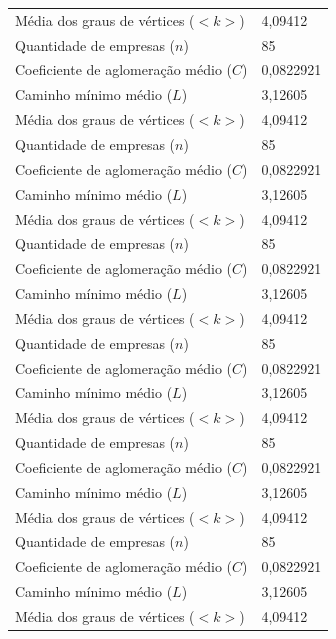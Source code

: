\begin{longtable}{l|l}
M\'edia dos graus de v\'ertices ($<k>$)        & 4,09412\\
Quantidade de empresas ($n$)                   & 85\\
Coeficiente de aglomera\c{c}\~ao m\'edio ($C$) & 0,0822921\\
Caminho m\'inimo m\'edio ($L$)                 & 3,12605\\
M\'edia dos graus de v\'ertices ($<k>$)        & 4,09412\\
Quantidade de empresas ($n$)                   & 85\\
Coeficiente de aglomera\c{c}\~ao m\'edio ($C$) & 0,0822921\\
Caminho m\'inimo m\'edio ($L$)                 & 3,12605\\
M\'edia dos graus de v\'ertices ($<k>$)        & 4,09412\\
Quantidade de empresas ($n$)                   & 85\\
Coeficiente de aglomera\c{c}\~ao m\'edio ($C$) & 0,0822921\\
Caminho m\'inimo m\'edio ($L$)                 & 3,12605\\
M\'edia dos graus de v\'ertices ($<k>$)        & 4,09412\\
Quantidade de empresas ($n$)                   & 85\\
Coeficiente de aglomera\c{c}\~ao m\'edio ($C$) & 0,0822921\\
Caminho m\'inimo m\'edio ($L$)                 & 3,12605\\
M\'edia dos graus de v\'ertices ($<k>$)        & 4,09412\\
Quantidade de empresas ($n$)                   & 85\\
Coeficiente de aglomera\c{c}\~ao m\'edio ($C$) & 0,0822921\\
Caminho m\'inimo m\'edio ($L$)                 & 3,12605\\
M\'edia dos graus de v\'ertices ($<k>$)        & 4,09412\\
Quantidade de empresas ($n$)                   & 85\\
Coeficiente de aglomera\c{c}\~ao m\'edio ($C$) & 0,0822921\\
Caminho m\'inimo m\'edio ($L$)                 & 3,12605\\
M\'edia dos graus de v\'ertices ($<k>$)        & 4,09412\\
\hline
\end{longtable}

\newpage

